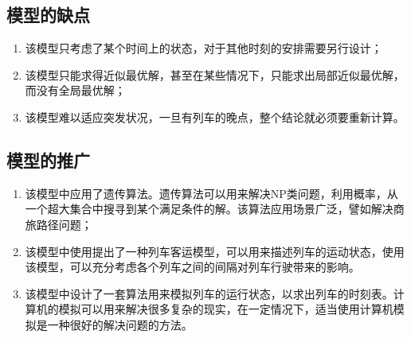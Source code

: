 \subsection{模型的缺点}

\begin{enumerate}
    \item 该模型只考虑了某个时间上的状态，对于其他时刻的安排需要另行设计；
    \item 该模型只能求得近似最优解，甚至在某些情况下，只能求出局部近似最优解，而没有全局最优解；
    \item 该模型难以适应突发状况，一旦有列车的晚点，整个结论就必须要重新计算。
\end{enumerate}

\subsection{模型的推广}

\begin{enumerate}
    \item 该模型中应用了遗传算法。遗传算法可以用来解决NP类问题，利用概率，从一个超大集合中搜寻到某个满足条件的解。该算法应用场景广泛，譬如解决商旅路径问题；
    \item 该模型中使用提出了一种列车客运模型，可以用来描述列车的运动状态，使用该模型，可以充分考虑各个列车之间的间隔对列车行驶带来的影响。
    \item 该模型中设计了一套算法用来模拟列车的运行状态，以求出列车的时刻表。计算机的模拟可以用来解决很多复杂的现实，在一定情况下，适当使用计算机模拟是一种很好的解决问题的方法。
\end{enumerate}